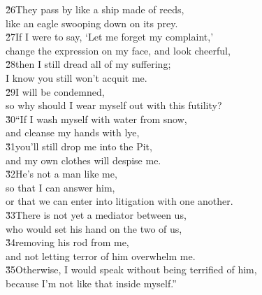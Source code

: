 \begin{poetry}
\poeml \v{26}They pass by like a ship made of reeds, \\
\poemll    like an eagle swooping down on its prey. \\
\poeml \v{27}If I were to say, `Let me forget my complaint,' \\
\poemll    change the expression on my face, and look cheerful, \\
\poeml \v{28}then I still dread all of my suffering; \\
\poemll    I know you still won't acquit me. \\
\poeml \v{29}I will be condemned, \\
\poemll    so why should I wear myself out with this futility? \\
\poeml \v{30}``If I wash myself with water from snow, \\
\poemll    and cleanse my hands with lye, \\
\poeml \v{31}you'll still drop me into the Pit, \\
\poemll    and my own clothes will despise me. \\
\poeml \v{32}He's not a man like me, \\
\poemll    so that I can answer him, \\
\poemlll       or that we can enter into litigation with one another. \\
\poeml \v{33}There is not yet a mediator between us, \\
\poemll    who would set his hand on the two of us, \\
\poeml \v{34}removing his rod from me, \\
\poemll    and not letting terror of him overwhelm me. \\
\poeml \v{35}Otherwise, I would speak without being terrified of him, \\
\poemll    because I'm not like that inside myself.''
\end{poetry}

